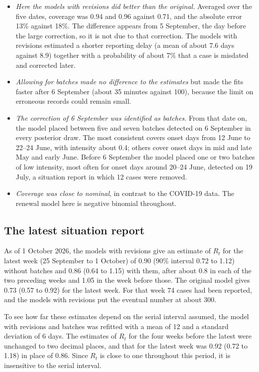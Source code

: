 \documentclass[11pt,a4paper]{article}
\begin{document}
\begin{itemize}[itemsep=2pt]
\item \emph{Here the models with revisions did better than the original.}
Averaged over the five dates, coverage was 0.94 and 0.96 against 0.71, and the
absolute error 13\% against 18\%. The difference appears from 5 September, the
day before the large correction, so it is not due to that correction. The
models with revisions estimated a shorter reporting delay (a mean of about 7.6
days against 8.9) together with a probability of about 7\% that a case is
misdated and corrected later.
\item \emph{Allowing for batches made no difference to the estimates} but made
the fits faster after 6 September (about 35 minutes against 100), because the
limit on erroneous records could remain small.
\item \emph{The correction of 6 September was identified as batches.} From that
date on, the model placed between five and seven batches detected on 6
September in every posterior draw. The most consistent covers onset days from
12 June to 22--24 June, with intensity about 0.4; others cover onset days in
mid and late May and early June. Before 6 September the model placed one or
two batches of low intensity, most often for onset days around 20--24 June,
detected on 19 July, a situation report in which 12 cases were removed.
\item \emph{Coverage was close to nominal}, in contrast to the COVID-19 data.
The renewal model here is negative binomial throughout.
\end{itemize}

\subsection{The latest situation report}

As of 1 October 2026, the models with revisions give an estimate of $R_t$ for
the latest week (25 September to 1 October) of 0.90 (90\% interval 0.72 to
1.12) without batches and 0.86 (0.64 to 1.15) with them, after about 0.8 in
each of the two preceding weeks and 1.05 in the week before those. The original
model gives 0.73 (0.57 to 0.92) for the latest week. For that week 74 cases had
been reported, and the models with revisions put the eventual number at about
300.

To see how far these estimates depend on the serial interval assumed, the
model with revisions and batches was refitted with a mean of 12 and a standard
deviation of 6 days. The estimates of $R_t$ for the four weeks before the
latest were unchanged to two decimal places, and that for the latest week was
0.92 (0.72 to 1.18) in place of 0.86. Since $R_t$ is close to one throughout
this period, it is insensitive to the serial interval.
\end{document}
